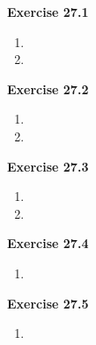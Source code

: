 




\textbf{Exercise 27.1}
\begin{enumerate}
    \item 
    \item 
\end{enumerate}

\textbf{Exercise 27.2}
\begin{enumerate}
    \item 
    \item 
\end{enumerate}

\textbf{Exercise 27.3}
\begin{enumerate}
    \item 
    \item 
\end{enumerate}

\textbf{Exercise 27.4}
\begin{enumerate}
    \item 
\end{enumerate}

\textbf{Exercise 27.5}
\begin{enumerate}
    \item 
\end{enumerate}

